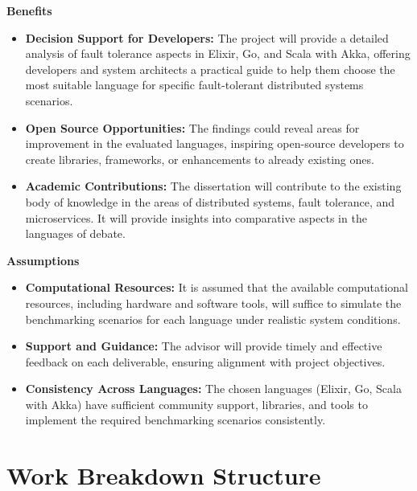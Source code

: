 \textbf{Benefits}

\begin{itemize}
      \item \textbf{Decision Support for Developers:}
            The project will provide a detailed analysis of fault tolerance aspects in Elixir, Go, and Scala with Akka, offering developers and system architects a practical guide to help them choose the most suitable language for specific fault-tolerant distributed systems scenarios.

      \item \textbf{Open Source Opportunities:}
            The findings could reveal areas for improvement in the evaluated languages, inspiring open-source developers to create libraries, frameworks, or enhancements to already existing ones.

      \item \textbf{Academic Contributions:}
            The dissertation will contribute to the existing body of knowledge in the areas of distributed systems, fault tolerance, and microservices. It will provide insights into comparative aspects in the languages of debate.

\end{itemize}

\noindent \textbf{Assumptions}

\begin{itemize}
      \item \textbf{Computational Resources:}
            It is assumed that the available computational resources, including hardware and software tools, will suffice to simulate the benchmarking scenarios for each language under realistic system conditions.

      \item \textbf{Support and Guidance:}
            The advisor will provide timely and effective feedback on each deliverable, ensuring alignment with project objectives.

      \item \textbf{Consistency Across Languages:}
            The chosen languages (Elixir, Go, Scala with Akka) have sufficient community support, libraries, and tools to implement the required benchmarking scenarios consistently.
\end{itemize}

\section{Work Breakdown Structure}

